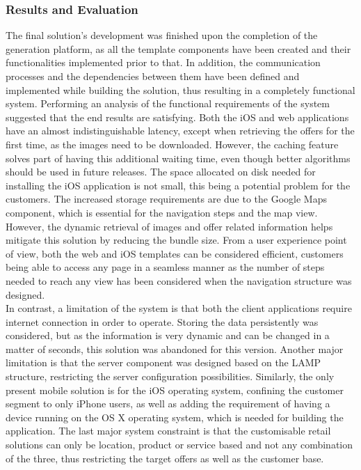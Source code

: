 \subsubsection{Results and Evaluation}

The final solution's development was finished upon the completion of the generation platform, as all the template components have been created and their functionalities implemented prior to that. In addition, the communication processes and the dependencies between them have been defined and implemented while building the solution, thus resulting in a completely functional system. Performing an analysis of the functional requirements of the system suggested that the end results are satisfying. Both the iOS and web applications have an almost indistinguishable latency, except when retrieving the offers for the first time, as the images need to be downloaded. However, the caching feature solves part of having this additional waiting time, even though better algorithms should be used in future releases. The space allocated on disk needed for installing the iOS application is not small, this being a potential problem for the customers. The increased storage requirements are due to the Google Maps component, which is essential for the navigation steps and the map view. However, the dynamic retrieval of images and offer related information helps mitigate this solution by reducing the bundle size. From a user experience point of view, both the web and iOS templates can be considered efficient, customers being able to access any page in a seamless manner as the number of steps needed to reach any view has been considered when the navigation structure was designed. \\

In contrast, a limitation of the system is that both the client applications require internet connection in order to operate. Storing the data persistently was considered, but as the information is very dynamic and can be changed in a matter of seconds, this solution was abandoned for this version. Another major limitation is that the server component was designed based on the LAMP structure, restricting the server configuration possibilities. Similarly, the only present mobile solution is for the iOS operating system, confining the customer segment to only iPhone users, as well as adding the requirement of having a device running on the OS X operating system, which is needed for building the application. The last major system constraint is that the customisable retail solutions can only be location, product or service based and not any combination of the three, thus restricting the target offers as well as the customer base. \\

